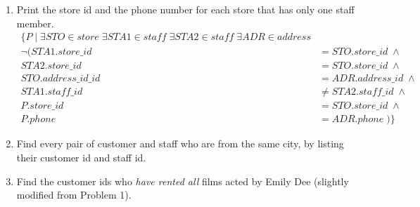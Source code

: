 \documentclass[paper=a4, fontsize=11pt]{scrartcl} %
\numberwithin{figure}{section} %
\numberwithin{table}{section} %
\begin{document}
\begin{enumerate}
\begin{enumerate}
\item Print the store id and the phone number for each store that has only one staff member.
\begin{equation*}
\begin{aligned}
 \{ P \; | \; \exists STO \in store \; \exists STA1 \in staff \; \exists STA2 \in staff \; \exists ADR \in address\\
 \neg(STA1.store\_id &= STO.store\_id \; \wedge \\
 STA2.store\_id &= STO.store\_id \; \wedge \\
 STO.address\_id\_id &= ADR.address\_id \; \wedge  \\
 STA1.staff\_id &\neq STA2.staff\_id \; \wedge \\
 P.store\_id &= STO.store\_id \; \wedge \\
P.phone &= ADR.phone \; )  \}
\end{aligned}
\end{equation*}

\item Find every pair of customer and staff who are from the same city, by listing their customer id and staff id.

\item Find the customer ids who \textit{have rented all} films acted by Emily Dee (slightly modified from Problem 1).

\end{enumerate}

\end{enumerate}
\end{document}
